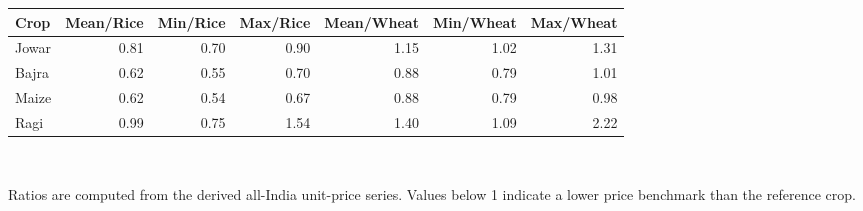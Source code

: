 \begin{small}
\begin{tabular}{lrrrrrr}
\toprule
Crop & Mean/Rice & Min/Rice & Max/Rice & Mean/Wheat & Min/Wheat & Max/Wheat \\
\midrule
Jowar & 0.81 & 0.70 & 0.90 & 1.15 & 1.02 & 1.31 \\
Bajra & 0.62 & 0.55 & 0.70 & 0.88 & 0.79 & 1.01 \\
Maize & 0.62 & 0.54 & 0.67 & 0.88 & 0.79 & 0.98 \\
Ragi & 0.99 & 0.75 & 1.54 & 1.40 & 1.09 & 2.22 \\
\bottomrule
\end{tabular}
\\[0.3em]
\parbox{0.95\linewidth}{\footnotesize Ratios are computed from the derived all-India unit-price series. Values below 1 indicate a lower price benchmark than the reference crop.}
\end{small}
